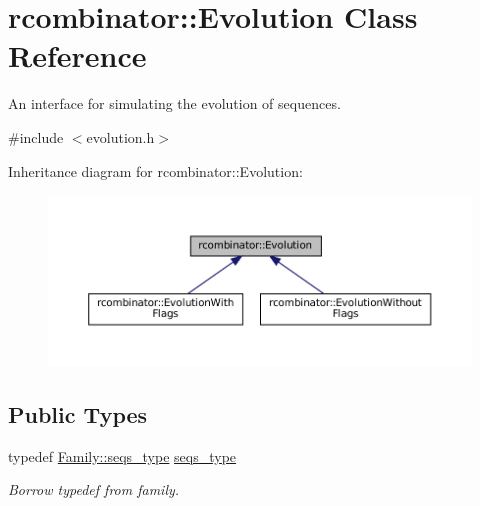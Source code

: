 \hypertarget{classrcombinator_1_1Evolution}{}\section{rcombinator\+:\+:Evolution Class Reference}
\label{classrcombinator_1_1Evolution}


An interface for simulating the evolution of sequences.  




{\ttfamily \#include $<$evolution.\+h$>$}



Inheritance diagram for rcombinator\+:\+:Evolution\+:
\nopagebreak
\begin{figure}[H]
\begin{center}
\leavevmode
\includegraphics[width=350pt]{classrcombinator_1_1Evolution__inherit__graph}
\end{center}
\end{figure}
\subsection*{Public Types}
\begin{DoxyCompactItemize}
\item 
\mbox{\label{classrcombinator_1_1Evolution_a6ed5af2795fb3bae514a5de924969db4}} 
typedef \mbox{\hyperlink{classrcombinator_1_1Family_abe1bd4ecd0792a403e9a4af26b8e5156}{Family\+::seqs\+\_\+type}} \mbox{\hyperlink{classrcombinator_1_1Evolution_a6ed5af2795fb3bae514a5de924969db4}{seqs\+\_\+type}}
\begin{DoxyCompactList}\small\item\em Borrow typedef from family. \end{DoxyCompactList}\end{DoxyCompactItemize}
